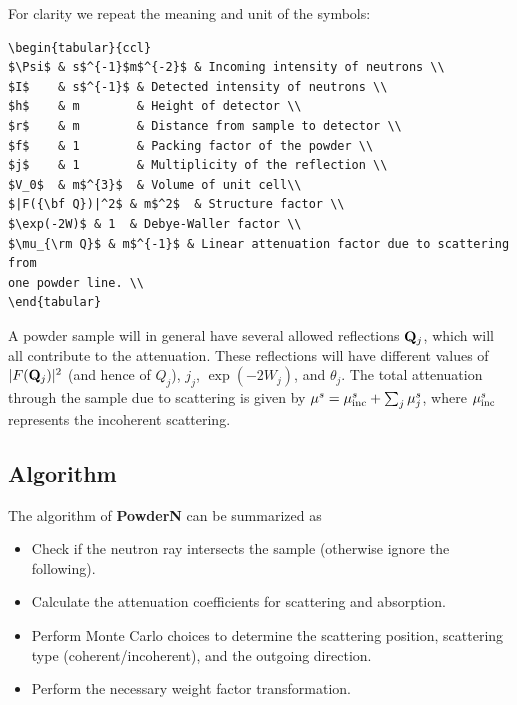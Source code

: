 For clarity we repeat the meaning and unit of the symbols:
%
\begin{lstlisting}
\begin{tabular}{ccl}
$\Psi$ & s$^{-1}$m$^{-2}$ & Incoming intensity of neutrons \\
$I$    & s$^{-1}$ & Detected intensity of neutrons \\
$h$    & m        & Height of detector \\
$r$    & m        & Distance from sample to detector \\
$f$    & 1        & Packing factor of the powder \\
$j$    & 1        & Multiplicity of the reflection \\
$V_0$  & m$^{3}$  & Volume of unit cell\\
$|F({\bf Q})|^2$ & m$^2$  & Structure factor \\
$\exp(-2W)$ & 1  & Debye-Waller factor \\
$\mu_{\rm Q}$ & m$^{-1}$ & Linear attenuation factor due to scattering from
one powder line. \\
\end{tabular}
\end{lstlisting}
%

A powder sample will in general have several allowed reflections
${\bf Q}_j$, which will all contribute to the attenuation.
These reflections will have different values of
$|F({\bf Q}_j)|^2$ (and hence of $Q_j$), $j_j$, $\exp(-2W_j)$,
and $\theta_j$.
The total attenuation through the sample due to scattering is given by
$\mu^s = \mu_{\rm inc}^s + \sum_j \mu^s_j $,
where $\mu_{\rm inc}^s$ represents the incoherent scattering.

\subsection{Algorithm}
The algorithm of {\bf PowderN} can be summarized as
\begin{itemize}
\item Check if the neutron ray intersects the sample (otherwise ignore
the following).
\item Calculate the attenuation coefficients for scattering and absorption.
\item Perform Monte Carlo choices to determine the scattering position,
scattering type (coherent/incoherent), and the outgoing direction.
\item Perform the necessary weight factor transformation.
\end{itemize}

